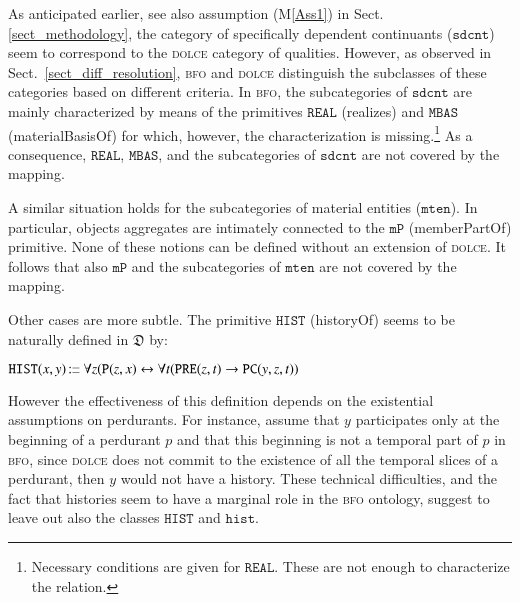 \documentclass[ao]{iosart2x}
\newcommand{\nb}[1]{\textcolor{red}{$|$}\marginpar{\hspace*{-0cm}\parbox{20mm}{\scriptsize\raggedright\textcolor{red}{#1}}}}
\newcommand{\bflist}{\begin{list}{}{\setlength{\topsep}{2mm}\setlength{\parsep}{0mm}\setlength{\leftmargin}{9.2mm}\setlength{\labelwidth}{8mm}}}
\newcommand{\eflist}{\end{list}}
\newcommand{\pr}[1]{\mathtt{#1}}
\newcommand{\cn}[1]{\mathtt{#1}}
\newcommand{\ifif}{\leftrightarrow}
\newcommand\textequal{%
 \rule[.08ex]{5pt}{0.35pt}\llap{\rule[.78ex]{5pt}{0.35pt}}}
\newcommand{\sdef}{{\hspace{1.5pt}:\hspace{-2.5pt}\textequal\hspace{3pt}}}
\newcommand{\dolce}{{\textsc{dolce}}}
\newcommand{\bfo}{{\textsc{bfo}}}
\newcommand {\thdolce} {\ensuremath{\mathfrak{D}}}
\newcommand {\Pd} {\ensuremath{\pr{P}}}
\newcommand {\PREd} {\ensuremath{\pr{PRE}}}
\newcommand {\PCd} {\ensuremath{\pr{PC}}}
\newcommand{\sdcntbcat}{\cn{sdcnt}}
\newcommand{\mtenbcat}{\cn{mten}}
\newcommand{\histbcat}{\cn{hist}}
\newcommand{\bfompart}{\pr{mP}}
\newcommand{\bforealizes}{\pr{REAL}}
\newcommand{\bfohistory}{\pr{HIST}}
\begin{document}
As anticipated earlier, see also assumption (M\ref{Ass1}) in Sect. \ref{sect_methodology}, the category of specifically dependent continuants ($\sdcntbcat$) seem to correspond to the {\dolce} category of qualities. However, as observed in Sect.~\ref{sect_diff_resolution}, {\bfo} and {\dolce} distinguish the subclasses of these categories based on different criteria. In {\bfo}, the subcategories of $\sdcntbcat$ are mainly characterized by means of the primitives $\bforealizes$ (realizes) and $\pr{MBAS}$ (materialBasisOf) for which, however, the characterization is missing.\footnote{Necessary conditions are given for $\bforealizes$. These are not enough to characterize the relation.} As a consequence, $\bforealizes$, $\pr{MBAS}$, and the subcategories of $\sdcntbcat$ are not covered by the mapping.

A similar situation holds for the subcategories of material entities ($\mtenbcat$). In particular, objects aggregates are intimately connected to the $\bfompart$ (memberPartOf) primitive. None of these notions can be defined without an extension of {\dolce}. It follows that also $\bfompart$ and the subcategories of $\mtenbcat$ are not covered by the mapping.

Other cases are more subtle. The primitive $\bfohistory$ (historyOf) seems to be naturally defined in $\thdolce$ by:
%
\bflist
\item[] $\bfohistory(x,y) \sdef \forall z(\Pd(z,x) \ifif \forall t(\PREd(z,t) \to \PCd(y,z,t))$
\eflist
%
However the effectiveness of this definition depends on the existential assumptions on perdurants. 
For instance, assume that $y$ participates only at the beginning of a perdurant $p$ and that this beginning is not a temporal part of $p$ in {\bfo}, since {\dolce} does not commit to the existence of all the temporal slices of a perdurant, then $y$ would not have a history. %
These technical difficulties, and the fact that histories seem to have a marginal role in the {\bfo} ontology, suggest to leave out also the classes $\bfohistory$ and $\histbcat$.
\end{document}
